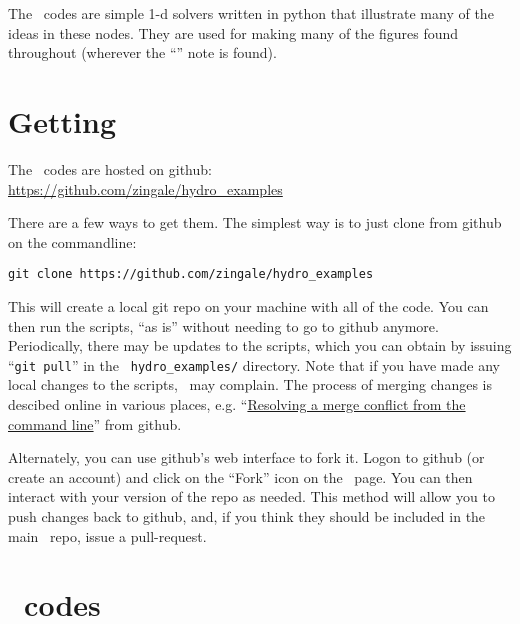 \label{app:hydroex}

\begin{quote}
\end{quote}

The \hydroex\ codes are simple 1-d solvers written in python that illustrate many of the
ideas in these nodes.  They are used for making many of the figures found throughout
(wherever the ``\hydroexdoit{}'' note is found).

\section{Getting \hydroex}

The \hydroex\ codes are hosted on github:\\
\url{https://github.com/zingale/hydro_examples}

There are a few ways to get them.  The simplest way is to just clone
from github on the commandline:

\begin{verbatim}
git clone https://github.com/zingale/hydro_examples
\end{verbatim}

This will create a local git repo on your machine with all of the
code.  You can then run the scripts, ``as is'' without needing to go
to github anymore.  Periodically, there may be updates to the scripts,
which you can obtain by issuing ``{\tt git pull}'' in the {\tt
hydro\_examples/} directory.  Note that if you have made any local
changes to the scripts, \git\ may complain.  The process of merging
changes is descibed online in various places,
e.g. ``\href{https://help.github.com/articles/resolving-a-merge-conflict-from-the-command-line}{Resolving
a merge conflict from the command line}'' from github.

Alternately, you can use github's web interface to fork it.  Logon to
github (or create an account) and click on the ``Fork'' icon on the
\hydroex\ page.  You can then interact with your version of the repo
as needed.  This method will allow you to push changes back to github,
and, if you think they should be included in the main \hydroex\ repo,
issue a pull-request.

\section{\hydroex\ codes}

